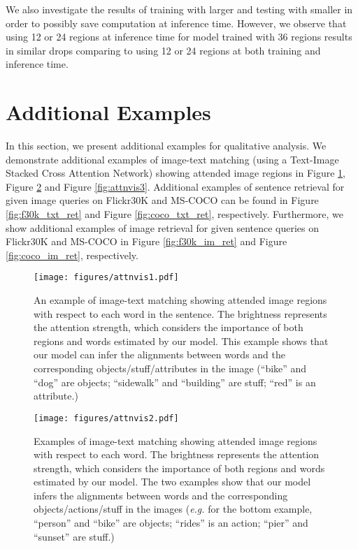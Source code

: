\documentclass[runningheads]{llncs}
\begin{document}
We also investigate the results of training with larger  and testing with smaller  in order to possibly save computation at inference time. However, we observe that using 12 or 24 regions at inference time for model trained with 36 regions results in similar drops comparing to using 12 or 24 regions at both training and inference time. 


\section{Additional Examples}
\label{sec:add_ex}
In this section, we present additional examples for qualitative analysis. We demonstrate additional examples of image-text matching (using a Text-Image Stacked Cross Attention Network) showing attended image regions in Figure \ref{fig:attnvis1}, Figure \ref{fig:attnvis2} and Figure \ref{fig:attnvis3}. Additional examples of sentence retrieval for given image queries on Flickr30K and MS-COCO can be found in Figure \ref{fig:f30k_txt_ret} and Figure \ref{fig:coco_txt_ret}, respectively. Furthermore, we show additional examples of image retrieval for given sentence queries on Flickr30K and MS-COCO in Figure \ref{fig:f30k_im_ret} and Figure \ref{fig:coco_im_ret}, respectively.

\begin{figure}[b!]
\centering
\texttt{[image: figures/attnvis1.pdf]}
\caption{An example of image-text matching showing attended image regions with respect to each word in the sentence. The brightness represents the attention strength, which considers the importance
of both regions and words estimated by our model. This example shows that our model can infer the alignments between words and the corresponding objects/stuff/attributes in the image (``bike'' and ``dog'' are objects; ``sidewalk'' and ``building'' are stuff; ``red'' is an attribute.)}
\label{fig:attnvis1}
\end{figure}

\begin{figure}
\centering
\texttt{[image: figures/attnvis2.pdf]}
\caption{Examples of image-text matching showing attended image regions with respect to each word. The brightness represents the attention strength, which considers the importance
of both regions and words estimated by our model. The two examples show that our model infers the alignments between words and the corresponding objects/actions/stuff in the images ({\em e.g.} for the bottom example, ``person'' and ``bike'' are objects; ``rides'' is an action; ``pier'' and ``sunset'' are stuff.)}
\label{fig:attnvis2}
\end{figure}
\end{document}
